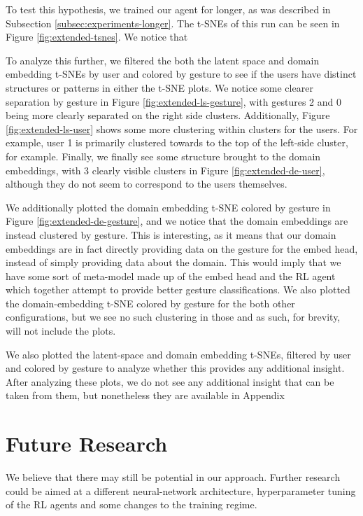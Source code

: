 To test this hypothesis, we trained our agent for longer, as was described in Subsection \ref{subsec:experiments-longer}.
The t-SNEs of this run can be seen in Figure \ref{fig:extended-tsnes}.
We notice that 

To analyze this further, we filtered the both the latent space and domain embedding t-SNEs by user and colored by gesture to see if the users have distinct structures or patterns in either the t-SNE plots.
We notice some clearer separation by gesture in Figure \ref{fig:extended-ls-gesture}, with gestures 2 and 0 being more clearly separated on the right side clusters.
Additionally, Figure \ref{fig:extended-ls-user} shows some more clustering within clusters for the users. For example, user 1 is primarily clustered towards to the top of the left-side cluster, for example.
Finally, we finally see some structure brought to the domain embeddings, with 3 clearly visible clusters in Figure \ref{fig:extended-de-user}, although they do not seem to correspond to the users themselves.

We additionally plotted the domain embedding t-SNE colored by gesture in Figure \ref{fig:extended-de-gesture}, and we notice that the domain embeddings are instead clustered by gesture.
This is interesting, as it means that our domain embeddings are in fact directly providing data on the gesture for the embed head, instead of simply providing data about the domain.
This would imply that we have some sort of meta-model made up of the embed head and the RL agent which together attempt to provide better gesture classifications.
We also plotted the domain-embedding t-SNE colored by gesture for the both other configurations, but we see no such clustering in those and as such, for brevity, will not include the plots.

We also plotted the latent-space and domain embedding t-SNEs, filtered by user and colored by gesture to analyze whether this provides any additional insight.
After analyzing these plots, we do not see any additional insight that can be taken from them, but nonetheless they are available in Appendix

\section{Future Research}

We believe that there may still be potential in our approach.
Further research could be aimed at a different neural-network architecture, hyperparameter tuning of the RL agents and some changes to the training regime.

